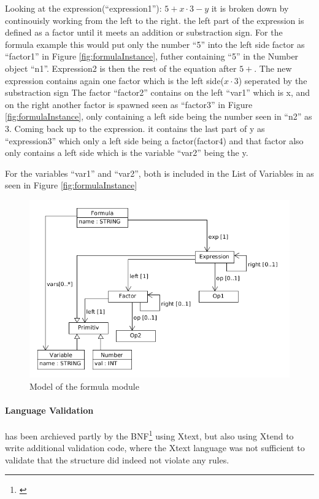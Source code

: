 Looking at the expression(``expression1''): $5 + x \cdot 3 - y$ it is broken down by continouisly
working from the left to the right. the left part of the expression is defined as a factor until
it meets an addition or substraction sign. For the formula example this would put only the number
``5'' into the left side factor as ``factor1'' in Figure \ref{fig:formulaInstance},
futher containing ``5'' in the Number object ``n1''.
Expression2 is then the rest of the equation after $5 +$. The new expression
contains again one factor which is the left side($x \cdot 3$) seperated by the substraction sign
The factor ``factor2'' contains on the left ``var1'' which is x, and on the right another factor
is spawned seen as ``factor3'' in Figure \ref{fig:formulaInstance}, only containing a left
side being the number seen in ``n2'' as 3.
Coming back up to the expression. it contains the last part of y as ``expression3''
which only a left side being a factor(factor4) and that factor also only contains a left side
which is the variable ``var2'' being the y.

For the variables ``var1'' and ``var2'', both is included in the List of Variables in as seen in
Figure \ref{fig:formulaInstance}


\begin{figure}
  \begin{center}
  \includegraphics[width=\linewidth]{images/MetaFormula}
  \end{center}
  \caption{Model of the formula module}
  \label{fig:formulaModel}
\end{figure}
\paragraph{Language Validation}
has been archieved partly by the BNF\footnote{\cite{BNF}} using Xtext, but also
using Xtend to write additional validation code, where the Xtext language was not sufficient
to validate that the structure did indeed not violate any rules.

